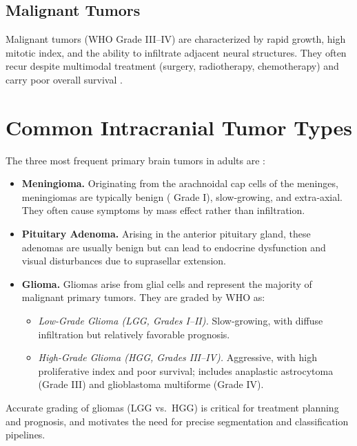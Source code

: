 \subsection{Malignant Tumors}
Malignant tumors (WHO Grade III–IV) are characterized by rapid growth, high mitotic index, and the ability to infiltrate adjacent neural structures. They often recur despite multimodal treatment (surgery, radiotherapy, chemotherapy) and carry poor overall survival \cite{ref8}.

\section{Common Intracranial Tumor Types}
\label{sec:common-tumor-types}

The three most frequent primary brain tumors in adults are \cite{naser2020lgmi}:

\begin{itemize}
      \item \textbf{Meningioma.}
            Originating from the arachnoidal cap cells of the meninges, meningiomas are typically benign ( Grade I), slow‐growing, and extra‐axial. They often cause symptoms by mass effect rather than infiltration.

      \item \textbf{Pituitary Adenoma.}
            Arising in the anterior pituitary gland, these adenomas are usually benign but can lead to endocrine dysfunction and visual disturbances due to suprasellar extension.

      \item \textbf{Glioma.}
            Gliomas arise from glial cells and represent the majority of malignant primary  tumors. They are graded by WHO as:
            \begin{itemize}
                  \item \emph{Low-Grade Glioma (LGG, Grades I–II).} Slow‐growing, with diffuse infiltration but relatively favorable prognosis.
                  \item \emph{High-Grade Glioma (HGG, Grades III–IV).} Aggressive, with high proliferative index and poor survival; includes anaplastic astrocytoma (Grade III) and glioblastoma multiforme (Grade IV).
            \end{itemize}
\end{itemize}

Accurate grading of gliomas (LGG vs.\ HGG) is critical for treatment planning and prognosis, and motivates the need for precise segmentation and classification pipelines.


